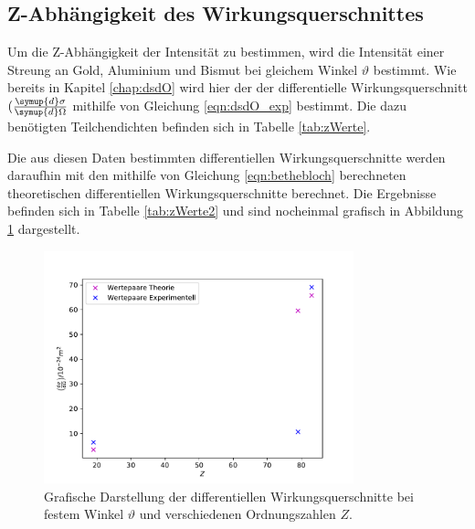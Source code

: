 \subsection{Z-Abhängigkeit des Wirkungsquerschnittes}
Um die Z-Abhängigkeit der Intensität zu bestimmen, wird die Intensität einer Streung an Gold, Aluminium und Bismut bei gleichem Winkel $\vartheta$ bestimmt. Wie bereits in Kapitel \ref{chap:dsdO} wird hier der der differentielle Wirkungsquerschnitt $(\frac{\symup{d}\sigma}{\symup{d}\Omega}$ mithilfe von Gleichung \ref{eqn:dsdO_exp} bestimmt.
Die dazu benötigten Teilchendichten befinden sich in Tabelle \ref{tab:zWerte}.

Die aus diesen Daten bestimmten differentiellen Wirkungsquerschnitte werden daraufhin mit den mithilfe von Gleichung \eqref{eqn:bethebloch} berechneten theoretischen differentiellen Wirkungsquerschnitte berechnet.
Die Ergebnisse befinden sich in Tabelle \ref{tab:zWerte2} und sind nocheinmal grafisch in Abbildung \ref{fig:zWerte2} dargestellt.

\begin{figure}
    \centering
    \includegraphics[width = 0.8\textwidth]{data/plots/atomic_number.pdf}
    \caption{Grafische Darstellung der differentiellen Wirkungsquerschnitte bei festem Winkel $\vartheta$ und verschiedenen Ordnungszahlen $Z$.}
    \label{fig:zWerte2}
\end{figure}

\FloatBarrier
